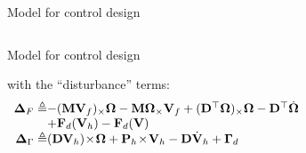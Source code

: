 \documentclass{beamer}
\begin{document}
\begin{frame}{Model for control design}
\begin{columns}
\begin{block}{Model for control design}
		
		\noindent with the ``disturbance'' terms: 
		\[
		\begin{array}{rl}
		\mathbf{\Delta}_F \triangleq\!\!\!\!\!\!& -(\mathbf{M}\mathbf{V}_f)_\times \mathbf{\Omega} -\mathbf{M} \mathbf{\Omega}_\times \mathbf{V}_f + (\mathbf{D}^\top \mathbf{\Omega})_\times \mathbf{\Omega} -\mathbf{D}^\top \dot{\mathbf{\Omega}}\\
		&+ \mathbf{F}_d(\mathbf{V}_h) - \mathbf{F}_d(\mathbf{V}) \\
		\mathbf{\Delta}_{\Gamma} \triangleq\!\!\!\!\!\! &(\mathbf{DV}_h)\!\times \!\mathbf{\Omega} + \mathbf{P}_h \!\times \!\mathbf{V}_h  - \mathbf{D}\dot{\mathbf{V}}_h  + \mathbf{\Gamma}_d\vspace{-0.1cm}
		\end{array} %
		\]
	\end{block}
\end{columns}
	
\end{frame}
\end{document}
